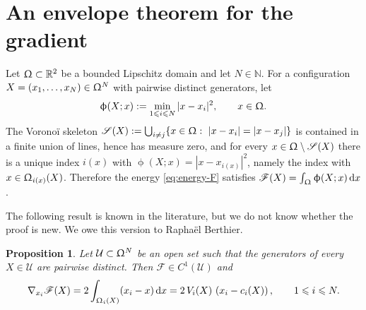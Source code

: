 \documentclass[letterpaper,11pt,twoside]{article}
\numberwithin{figure}{section}
\numberwithin{table}{section}
\theoremstyle{cpamplain}
\newtheorem{proposition}[theorem]{Proposition}
\theoremstyle{cpamdefinition}
\newcommand{\diff}{\mathrm{d}}
\let\phi\upphi
\let\Omega\Upomega
\renewcommand{\le}{\leqslant}
\numberwithin{equation}{section}
\begin{document}
\appendix

\section{An envelope theorem for the gradient}\label{sec:appendix-envelope}

Let $\Omega\subset\mathbb R^2$ be a bounded Lipschitz domain and let $N\in\mathbb N$.
For a configuration $X=(x_1,\dots,x_N)\in\Omega^N$ with pairwise distinct generators, let
\[
\phi(X;x):= \min_{1\le i\le N} |x-x_i|^2,
\qquad x\in\Omega .
\]
The Vorono\"i skeleton $\mathscr S(X):=\bigcup_{i\neq j}\{x\in\Omega:\ |x-x_i|=|x-x_j|\}$ is contained in a finite union of lines, hence has measure zero, and for every $x\in\Omega\setminus\mathscr S(X)$ there is a unique index $i(x)$ with $\phi(X;x)=|x-x_{i(x)}|^2$, namely the index with $x\in\Omega_{i(x)}(X)$.
Therefore the energy \eqref{eq:energy-F} satisfies $\mathscr F(X)=\int_\Omega\phi(X;x)\,\diff x$.

The following result is known in the literature, but we do not know whether the proof is new.
We owe this version to Rapha\"el Berthier.

\begin{proposition}\label{prop:env-gradient}
Let $\mathcal U\subset\Omega^N$ be an open set such that the generators of every $X\in\mathcal U$ are pairwise distinct.
Then $\mathscr F\in C^1(\mathcal U)$ and
\begin{equation}\label{eq:env-gradient}
\nabla_{x_i}\mathscr F(X)=2\int_{\Omega_i(X)}(x_i-x)\,\diff x
=2\,V_i(X)\,\left(x_i-c_i(X)\right),
\qquad 1\le i\le N.
\end{equation}
\end{proposition}
\end{document}
